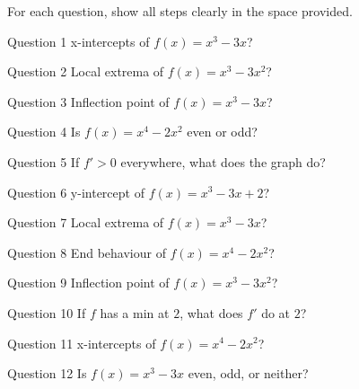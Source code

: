 \documentclass[11pt]{article}
\begin{document}
\clearpage
{}
For each question, show all steps clearly in the space provided.

\begin{qbox}{Question 1}
x-intercepts of $f(x)=x^3-3x$?\workspace{2.4cm}
\end{qbox}

\begin{qbox}{Question 2}
Local extrema of $f(x)=x^3-3x^2$?\workspace{2.4cm}
\end{qbox}

\begin{qbox}{Question 3}
Inflection point of $f(x)=x^3-3x$?\workspace{2.4cm}
\end{qbox}

\begin{qbox}{Question 4}
Is $f(x)=x^4-2x^2$ even or odd?\workspace{2.4cm}
\end{qbox}

\begin{qbox}{Question 5}
If $f'>0$ everywhere, what does the graph do?\workspace{2.4cm}
\end{qbox}

\begin{qbox}{Question 6}
y-intercept of $f(x)=x^3-3x+2$?\workspace{2.4cm}
\end{qbox}

\begin{qbox}{Question 7}
Local extrema of $f(x)=x^3-3x$?\workspace{2.4cm}
\end{qbox}

\begin{qbox}{Question 8}
End behaviour of $f(x)=x^4-2x^2$?\workspace{2.4cm}
\end{qbox}

\begin{qbox}{Question 9}
Inflection point of $f(x)=x^3-3x^2$?\workspace{2.4cm}
\end{qbox}

\begin{qbox}{Question 10}
If $f$ has a min at $2$, what does $f'$ do at $2$?\workspace{2.4cm}
\end{qbox}

\begin{qbox}{Question 11}
x-intercepts of $f(x)=x^4-2x^2$?\workspace{2.4cm}
\end{qbox}

\begin{qbox}{Question 12}
Is $f(x)=x^3-3x$ even, odd, or neither?\workspace{2.4cm}
\end{qbox}
\end{document}
